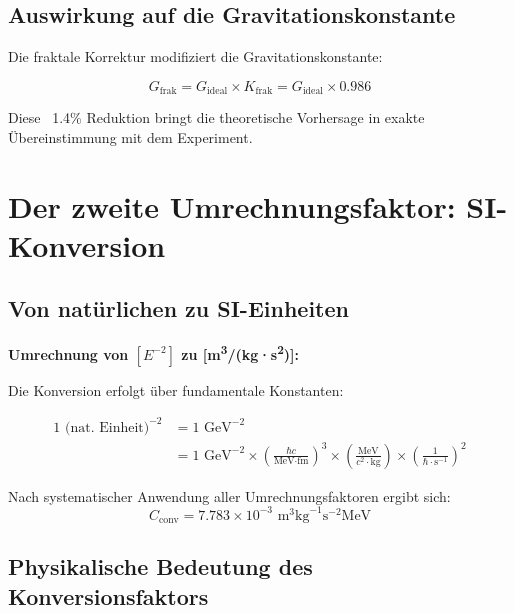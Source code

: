 \documentclass[12pt,a4paper]{article}
\begin{document}
	\subsection{Auswirkung auf die Gravitationskonstante}
	
	Die fraktale Korrektur modifiziert die Gravitationskonstante:
	
	\begin{equation}
		G_{\text{frak}} = G_{\text{ideal}} \times K_{\text{frak}} = G_{\text{ideal}} \times 0.986
	\end{equation}
	
	Diese ~1.4\% Reduktion bringt die theoretische Vorhersage in exakte Übereinstimmung mit dem Experiment.
	
	\section{Der zweite Umrechnungsfaktor: SI-Konversion}
	
	\subsection{Von natürlichen zu SI-Einheiten}
	
	\begin{dimensional}
		\textbf{Umrechnung von $[E^{-2}]$ zu [m\textsuperscript{3}/(kg·s\textsuperscript{2})]:}
		
		Die Konversion erfolgt über fundamentale Konstanten:
		
		\begin{align}
			1 \text{ (nat. Einheit)}^{-2} &= 1 \text{ GeV}^{-2} \\
			&= 1 \text{ GeV}^{-2} \times \left(\frac{\hbar c}{\text{MeV·fm}}\right)^3 \times \left(\frac{\text{MeV}}{c^2 \cdot \text{kg}}\right) \times \left(\frac{1}{\hbar \cdot \text{s}^{-1}}\right)^2
		\end{align}
		
		Nach systematischer Anwendung aller Umrechnungsfaktoren ergibt sich:
		\begin{equation}
			C_{\text{conv}} = 7.783 \times 10^{-3} \text{ m}^3\text{kg}^{-1}\text{s}^{-2}\text{MeV}
		\end{equation}
	\end{dimensional}
	
	\subsection{Physikalische Bedeutung des Konversionsfaktors}
	
\end{document}

